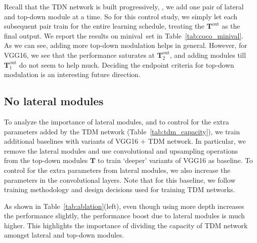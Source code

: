 \documentclass[10pt,twocolumn,letterpaper]{article}
\newcommand{\minival}{minival\raisebox{0.2ex}{$\ast$}}
\begin{document}
Recall that the TDN network is built progressively, \ie, we add one pair of lateral and top-down module at a time. So for this control study, we simply let each subsequent pair train for the entire learning schedule, treating the $\mathbf{T}^\text{out}$ as the final output. We report the results on \minival\ set in Table~\ref{tab:coco_minival}. As we can see, adding more top-down modulation helps in general. However, for VGG16, we see that the performance saturates at $\mathbf{T}^\text{out}_2$, and adding modules till $\mathbf{T}^\text{out}_1$ do not seem to help much. Deciding the endpoint criteria for top-down modulation is an interesting future direction.

\subsection{No lateral modules}
To analyze the importance of lateral modules, and to control for the extra parameters added by the TDM network (Table~\ref{tab:tdm_capacity}), we train additional baselines with variants of VGG16 $+$ TDM network. In particular, we remove the lateral modules and use convolutional and upsampling operations from the top-down modules $\mathbf{T}$ to train `deeper' variants of VGG16 as baseline. To control for the extra parameters from lateral modules, we also increase the parameters in the convolutional layers. Note that for this baseline, we follow training methodology and design decisions used for training TDM networks. 

As shown in Table~\ref{tab:ablation}(left), even though using more depth increases the performance slightly, the performance boost due to lateral modules is much higher. This highlights the importance of dividing the capacity of TDM network amongst lateral and top-down modules.
\end{document}
